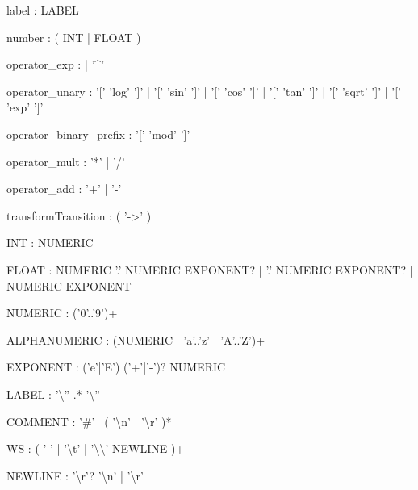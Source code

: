 \begin{bnfsource}
label :
  LABEL

number :
  ( INT | FLOAT )
  

operator_exp :
  | '^'

operator_unary :
  '[' 'log' ']'
  | '[' 'sin' ']'
  | '[' 'cos' ']'
  | '[' 'tan' ']'
  | '[' 'sqrt' ']'
  | '[' 'exp' ']'

operator_binary_prefix :
  '[' 'mod' ']'

operator_mult :
  '*' | '/'

operator_add :
  '+' | '-'

transformTransition :
  ( '->' )



INT :
  NUMERIC

FLOAT :
  NUMERIC '.' NUMERIC EXPONENT?
  | '.' NUMERIC EXPONENT?
  | NUMERIC EXPONENT

NUMERIC :
  ('0'..'9')+
  
ALPHANUMERIC :
  (NUMERIC | 'a'..'z' | 'A'..'Z')+
  
EXPONENT :
  ('e'|'E') ('+'|'-')? NUMERIC

LABEL :
  '{\textbackslash}'' .* '{\textbackslash}''

COMMENT :
  '#' ~( '{\textbackslash}n' | '{\textbackslash}r' )*

WS :
  ( ' ' | '{\textbackslash}t' | '{\textbackslash}{\textbackslash}' NEWLINE )+

NEWLINE :
  '{\textbackslash}r'? '{\textbackslash}n' | '{\textbackslash}r'

\end{bnfsource}
